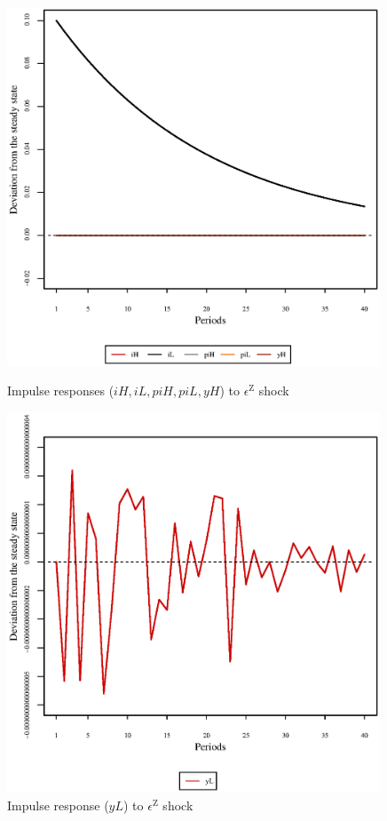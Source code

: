 \begin{figure}[h]
\begin{minipage}{0.5\textwidth}
\vspace*{-3em}
\centering
\includegraphics[width=0.99\textwidth, scale=0.55]{plots/plot_9.eps}
\caption{Impulse responses (${i\!H}, {i\!L}, {p\!i\!H}, {p\!i\!L}, {y\!H}$) to $\epsilon^{\mathrm{Z}}$ shock}
\end{minipage}
\begin{minipage}{0.5\textwidth}
\vspace*{-3em}
\centering
\includegraphics[width=0.99\textwidth, scale=0.55]{plots/plot_10.eps}
\caption{Impulse response (${y\!L}$) to $\epsilon^{\mathrm{Z}}$ shock}
\end{minipage}
\end{figure}


